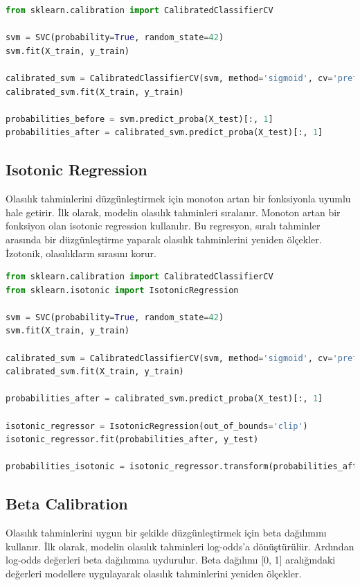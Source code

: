 \begin{lstlisting}[language=Python, caption=Scikit-learn'de Platt scaling örneği.]
from sklearn.calibration import CalibratedClassifierCV

svm = SVC(probability=True, random_state=42)
svm.fit(X_train, y_train)

calibrated_svm = CalibratedClassifierCV(svm, method='sigmoid', cv='prefit')
calibrated_svm.fit(X_train, y_train)

probabilities_before = svm.predict_proba(X_test)[:, 1]
probabilities_after = calibrated_svm.predict_proba(X_test)[:, 1]
\end{lstlisting}

\subsection{Isotonic Regression}
Olasılık tahminlerini düzgünleştirmek için monoton artan bir fonksiyonla uyumlu hale getirir. İlk olarak, modelin olasılık tahminleri sıralanır. Monoton artan bir fonksiyon olan isotonic regression kullanılır. Bu regresyon, sıralı tahminler arasında bir düzgünleştirme yaparak olasılık tahminlerini yeniden ölçekler. İzotonik, olasılıkların sırasını korur.

\begin{lstlisting}[language=Python, caption=Scikit-learn'de Isotonic Regression örneği.]
from sklearn.calibration import CalibratedClassifierCV
from sklearn.isotonic import IsotonicRegression

svm = SVC(probability=True, random_state=42)
svm.fit(X_train, y_train)

calibrated_svm = CalibratedClassifierCV(svm, method='sigmoid', cv='prefit')
calibrated_svm.fit(X_train, y_train)

probabilities_after = calibrated_svm.predict_proba(X_test)[:, 1]

isotonic_regressor = IsotonicRegression(out_of_bounds='clip')
isotonic_regressor.fit(probabilities_after, y_test)

probabilities_isotonic = isotonic_regressor.transform(probabilities_after)
\end{lstlisting}

\subsection{Beta Calibration}
Olasılık tahminlerini uygun bir şekilde düzgünleştirmek için beta dağılımını kullanır. İlk olarak, modelin olasılık tahminleri log-odds'a dönüştürülür. Ardından log-odds değerleri beta dağılımına uydurulur. Beta dağılımı [0, 1] aralığındaki değerleri modellere uygulayarak olasılık tahminlerini yeniden ölçekler.

